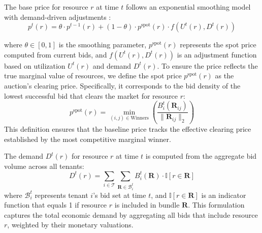 \documentclass[lettersize,journal]{IEEEtran}
\begin{document}
The base price for resource $r$ at time $t$ follows an exponential smoothing model with demand-driven adjustments \cite{agrawal2024dynamic}:
\begin{equation}
\label{eq:price_update}
p^t(r) = \theta \cdot p^{t-1}(r) + (1-\theta) \cdot p^{\text{spot}}(r) \cdot f(U^t(r), D^t(r))
\end{equation}

where $\theta \in [0,1]$ is the smoothing parameter, $p^{\text{spot}}(r)$ represents the spot price computed from current bids, and $f(U^t(r), D^t(r))$ is an adjustment function based on utilization $U^t(r)$ and demand $D^t(r)$. To ensure the price reflects the true marginal value of resources, we define the spot price $p^{\text{spot}}(r)$ as the auction's clearing price. Specifically, it corresponds to the bid density of the lowest successful bid that clears the market for resource $r$:
\begin{equation}
\label{eq:spot_price}
p^{\text{spot}}(r) = \min_{(i,j) \in \text{Winners}} \left( \frac{B_i^t(\mathbf{R}_{ij})}{\|\mathbf{R}_{ij}\|_2} \right)
\end{equation}
This definition ensures that the baseline price tracks the effective clearing price established by the most competitive marginal winner.

The demand $D^t(r)$ for resource $r$ at time $t$ is computed from the aggregate bid volume across all tenants:
\begin{equation}
\label{eq:demand}
D^t(r) = \sum_{i \in \mathcal{T}} \sum_{\mathbf{R} \in \mathcal{B}_i^t} B_i^t(\mathbf{R}) \cdot \mathbb{I}[r \in \mathbf{R}]
\end{equation}
where $\mathcal{B}_i^t$ represents tenant $i$'s bid set at time $t$, and $\mathbb{I}[r \in \mathbf{R}]$ is an indicator function that equals 1 if resource $r$ is included in bundle $\mathbf{R}$. This formulation captures the total economic demand by aggregating all bids that include resource $r$, weighted by their monetary valuations.
\end{document}
